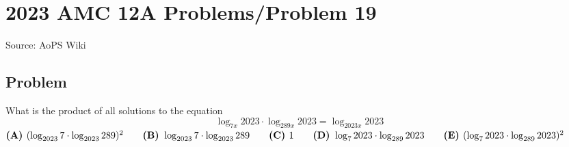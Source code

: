 \documentclass[12pt]{article}
\begin{document}
\section*{{2023 AMC 12A Problems/Problem 19}}
Source: AoPS Wiki

\subsection*{Problem}
What is the product of all solutions to the equation \[\log_{7x}2023\cdot \log_{289x}2023=\log_{2023x}2023\] $\textbf{(A) } (\log_{2023}7\cdot \log_{2023}289)^2\qquad\textbf{(B) } \log_{2023}7\cdot \log_{2023}289\qquad\textbf{(C) } 1 \\ \qquad \textbf{(D) } \log_{7}2023\cdot \log_{289}2023\qquad \textbf{(E) } (\log_7 2023\cdot\log_{289} 2023)^2$
\end{document}

